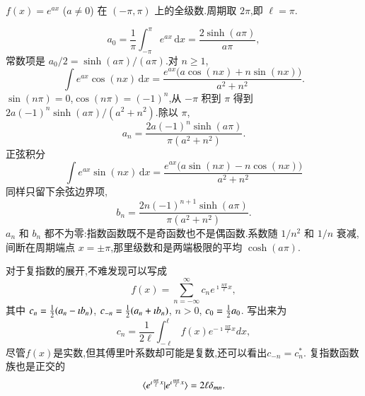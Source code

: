 \begin{example}
$f(x)=e^{ax}$ ($a\neq 0$) 在 $(-\pi,\pi)$ 上的全级数.周期取 $2\pi$,即 $\ell=\pi$.
\end{example}
\begin{solution}
\begin{equation}
  a_0=\frac{1}{\pi}\int_{-\pi}^{\pi}e^{ax}\,\mathrm{d}x=\frac{2\sinh(a\pi)}{a\pi},
\end{equation}
常数项是 $a_0/2=\sinh(a\pi)/(a\pi)$.对 $n\geq 1$,
\begin{equation}
  \int e^{ax}\cos(nx)\,\mathrm{d}x
  =\frac{e^{ax}\bigl(a\cos(nx)+n\sin(nx)\bigr)}{a^2+n^2}.
\end{equation}
$\sin(n\pi)=0$,$\cos(n\pi)=(-1)^n$,从 $-\pi$ 积到 $\pi$ 得到 $2a(-1)^n\sinh(a\pi)/(a^2+n^2)$.除以 $\pi$,
\begin{equation}
  a_n=\frac{2a(-1)^n\sinh(a\pi)}{\pi(a^2+n^2)}.
\end{equation}
正弦积分
\begin{equation}
  \int e^{ax}\sin(nx)\,\mathrm{d}x
  =\frac{e^{ax}\bigl(a\sin(nx)-n\cos(nx)\bigr)}{a^2+n^2}
\end{equation}
同样只留下余弦边界项,
\begin{equation}
  b_n=\frac{2n(-1)^{n+1}\sinh(a\pi)}{\pi(a^2+n^2)}.
\end{equation}
$a_n$ 和 $b_n$ 都不为零:指数函数既不是奇函数也不是偶函数.系数随 $1/n^2$ 和 $1/n$ 衰减,间断在周期端点 $x=\pm\pi$,那里级数和是两端极限的平均 $\cosh(a\pi)$.
\end{solution}

对于复指数的展开,不难发现可以写成
\begin{equation}
  f(x) = \sum_{n=-\infty}^{\infty} c_n e^{\imath \frac{n\pi}{\ell} x},
\end{equation}
其中
$c_n = {\frac{1}{2}}(a_n - \imath b_n)$, $c_{-n} = {\frac{1}{2}} (a_n + \imath b_n)$, $n>0$, $c_0 = {\frac{1}{2}} a_0$.
写出来为
\begin{equation}
  c_n = \frac{1}{2\ell} \int_{-\ell}^{\ell} f(x) e^{-\imath \frac{n\pi}{\ell} x} dx ,
\end{equation}
尽管$f(x)$是实数,但其傅里叶系数却可能是复数,还可以看出$c_{-n} = c_{n}^*$.
复指数函数族也是正交的
$$
  \braket{ e^{\imath \frac{n\pi}{\ell} x } | e^{\imath \frac{m\pi}{\ell} x } } = 2\ell \delta_{mn} .
$$

